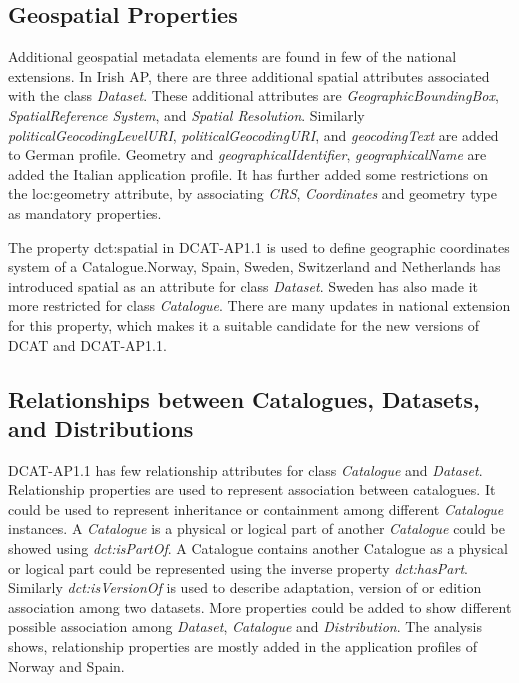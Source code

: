 \documentclass[<options>]{elsarticle}
\begin{document}
\subsection{Geospatial Properties}
Additional geospatial metadata elements are found in few of the national extensions. In Irish AP, there are three additional spatial attributes associated with the class \textit{Dataset}. These additional attributes are \textit{GeographicBoundingBox}, \textit{SpatialReference System}, and \textit{Spatial Resolution}. Similarly \textit{politicalGeocodingLevelURI}, \textit{politicalGeocodingURI}, and \textit{geocodingText }are added to German profile. Geometry and \textit{geographicalIdentifier}, \textit{geographicalName }are added the Italian application profile. It has further added some restrictions on the loc:geometry attribute, by associating \textit{CRS}, \textit{Coordinates} and geometry type  as mandatory properties.

The property dct:spatial in DCAT-AP1.1 is used to define geographic coordinates system of a Catalogue.Norway, Spain, Sweden, Switzerland and Netherlands has introduced spatial as an attribute for class\textit{ Dataset}. Sweden has also made it more restricted for class \textit{Catalogue}. There are many updates in national extension for this property, which makes it a suitable candidate for the new versions of DCAT and DCAT-AP1.1.

\subsection{Relationships between Catalogues, Datasets, and Distributions}
DCAT-AP1.1 has few relationship attributes for class\textit{ Catalogue} and \textit{Dataset}. Relationship properties are used to represent association between catalogues. It could be used to represent inheritance or containment among different \textit{Catalogue} instances. A \textit{Catalogue} is a physical or logical part of another \textit{Catalogue} could be showed using \textit{dct:isPartOf}. A Catalogue contains another Catalogue as a physical or logical part could be represented using the inverse property \textit{dct:hasPart}. Similarly \textit{dct:isVersionOf }is used to describe adaptation, version of or edition association among two datasets. More properties could be added to show different possible association among\textit{ Dataset}, \textit{Catalogue} and \textit{Distribution}. The analysis shows, relationship properties are mostly added in the application profiles of Norway and Spain.
\end{document}
